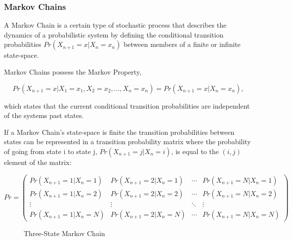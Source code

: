 \subsubsection{Markov Chains}

A Markov Chain is a certain type of stochastic process that describes the dynamics of a probabilistic system by defining the conditional transition probabilities \(Pr(X_{n+1}=x|X_n=x_n)\) between members of a finite or infinite state-space.



Markov Chains possess the Markov Property,

\[
Pr(X_{n+1}=x|X_1=x_1,X_2=x_2,...,X_n=x_n) = Pr(X_{n+1}=x|X_n=x_n),
\]

which states that the current conditional transition probabilities are independent of the systems past states.


If a Markov Chain's state-space is finite the transition probabilities between states can be represented in a transition probability matrix where the probability of going from state i to state j, $Pr(X_{n+1}=j|X_n=i)$, is equal to the $(i,j)$ element of the matrix:

\[
 Pr =
 \begin{pmatrix}
  Pr(X_{n+1}=1|X_n=1) & Pr(X_{n+1}=2|X_n=1) & \cdots & Pr(X_{n+1}=N|X_n=1) \\
  Pr(X_{n+1}=1|X_n=2) & Pr(X_{n+1}=2|X_n=2) & \cdots & Pr(X_{n+1}=N|X_n=2) \\
  \vdots  & \vdots  & \ddots & \vdots  \\
  Pr(X_{n+1}=1|X_n=N) & Pr(X_{n+1}=2|X_n=N) & \cdots & Pr(X_{n+1}=N|X_n=N)
 \end{pmatrix}
\]


\begin{figure}[h!]
\begin{center}
\end{center}
\caption{Three-State Markov Chain}
\label{3statemarkovchain}
\end{figure}

